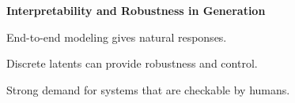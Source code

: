 \documentclass[aspectratio=169,12pt]{beamer}
\let\tempone\itemize
\let\temptwo\enditemize
\renewenvironment{itemize}{\tempone\addtolength{\itemsep}{0.5\baselineskip}}{\temptwo}
\newcommand{\thetitle}[1]{{\begin{center}\textbf{{#1}}\end{center}}}
\newcommand{\air}{\vspace{0.25cm}}
\begin{document}











\begin{frame}
  \thetitle{Interpretability and Robustness in Generation}

  \begin{itemize}
  \item End-to-end modeling gives natural responses.
    \air

  \item Discrete latents can provide robustness and control.
    \air

  \item Strong demand for systems that are checkable by humans.

  \end{itemize}

\end{frame}
\end{document}
